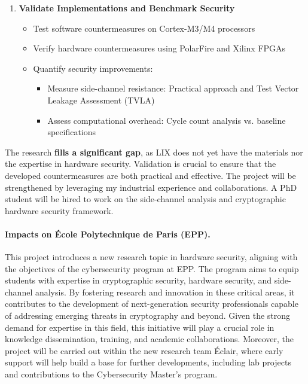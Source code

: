 \documentclass[11pt, a4paper]{article}
\begin{document}
\begin{enumerate}
\item \textbf{Validate Implementations and Benchmark Security}
\begin{itemize}[leftmargin=2em]
    \item Test software countermeasures on Cortex-M3/M4 processors
    \item Verify hardware countermeasures using PolarFire and Xilinx FPGAs
    \item Quantify security improvements:
    \begin{itemize}
        \item Measure side-channel resistance: Practical approach and Test Vector Leakage Assessment (TVLA)
        \item Assess computational overhead: Cycle count analysis vs. baseline specifications
    \end{itemize}
\end{itemize}
\end{enumerate}
The research \textbf{fills a significant gap}, as LIX does not yet have 
the materials nor the expertise in hardware security. 
Validation is crucial to ensure that the developed countermeasures 
are both practical and effective. The project will be strengthened by 
leveraging my industrial experience and collaborations. 
A PhD student will be hired to work on the side-channel 
analysis and cryptographic hardware security framework. 



\paragraph{Impacts on \'Ecole Polytechnique de Paris (EPP).}
This project introduces a new research topic in hardware security, 
aligning with the objectives of the cybersecurity program at 
EPP. 
The program aims to equip students with expertise in 
cryptographic security, hardware security, and side-channel analysis. 
By fostering research and innovation in these critical areas, 
it contributes to the development of next-generation security 
professionals capable of addressing emerging threats in 
cryptography and beyond. Given the strong demand for expertise 
in this field, this initiative will play a crucial role in knowledge 
dissemination, training, and academic collaborations. Moreover, the 
project will be carried out within the new research team \'Eclair, 
where early support will help build a base for further developments, 
including lab projects and contributions to the Cybersecurity 
Master's program.
\end{document}
